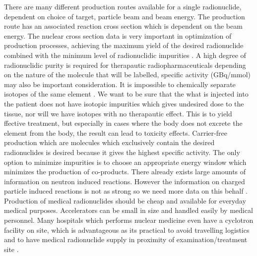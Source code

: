 There are many different production routes available for a single radionuclide, dependent on choice of target, particle beam and beam energy. The production route has an associated reaction cross section which is dependent on the beam energy. The nuclear cross section data is very important in optimization of production processes, achieving the maximum yield of the desired radionuclide combined with the minimum level of radionuclidic impurities \cite{international2012iaea}. A high degree of radionuclidic purity is required for therapautic radiopharmaceuticals depending on the nature of the molecule that will be labelled, specific activity (GBq/mmol) may also be important consideration. It is impossible to chemically separate isotopes of the same element \cite{Qaim2017c}. We want to be sure that the what is injected into the patient does not have isotopic impurities which gives undesired dose to the tissue, nor will we have isotopes with no therapautic effect. This is to yield ffective treatment, but especially in cases where the body does not excrete the element from the body, the result can lead to toxicity effects. Carrier-free production which are molecules which exclusively contain the desired radionuclides is desired because it gives the highest specific activity. The only option to minimize impurities is to choose an appropriate energy window which minimizes the production of co-products. There already exists large amounts of information on neutron induced reactions. However the information on charged particle induced reactions is not as strong so we need more data on this behalf \cite{Qaim2017c}. Production of medical radionuclides should be cheap and available for everyday medical purposes. Accelerators can be small in size and handled easily by medical personnel. Many hospitals which performs nuclear medicine even have a cyclotron facility on site, which is advantageous as its practical to avoid travelling logistics and to have medical radionuclide supply in proximity of examination/treatment site \cite{Ekeberg2020}.  




